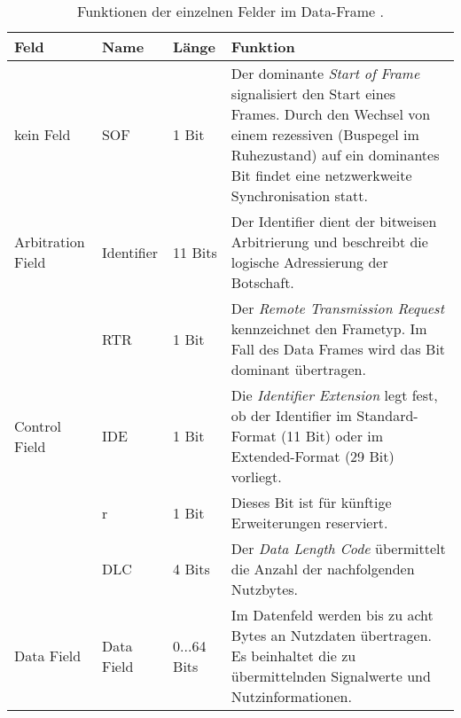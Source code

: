 \begin{table}[!htb]
	\centering
	\caption{Funktionen der einzelnen Felder im Data-Frame \cite{Wallentowitz.2011, Zimmermann.2014}.}
	\footnotesize
	\renewcommand{\arraystretch}{1.3}
	\begin{tabular}{l | l l p{7.5cm}}
		\toprule
		Feld              & Name       & Länge       & Funktion                                                                                                                                                                                                          \\ \midrule
		kein Feld         & SOF        & 1 Bit       & Der dominante \emph{Start of Frame} signalisiert den Start eines Frames. Durch den Wechsel von einem rezessiven (Buspegel im Ruhezustand) auf ein dominantes Bit findet eine netzwerkweite Synchronisation statt. \\
		\midrule
		Arbitration Field & Identifier & 11 Bits     & Der Identifier dient der bitweisen Arbitrierung und beschreibt die logische Adressierung der Botschaft.                                                                                                           \\
		                  & RTR        & 1 Bit       & Der \emph{Remote Transmission Request} kennzeichnet	den Frametyp. Im Fall des Data Frames wird das Bit dominant übertragen.                                                                                       \\
		\midrule
		Control Field & IDE        & 1 Bit       & Die \emph{Identifier Extension} legt fest, ob der Identifier im Standard-Format (11 Bit) oder im Extended-Format (29 Bit) vorliegt.                                                                               \\
		                  & r          & 1 Bit       & Dieses Bit ist für künftige Erweiterungen reserviert.                                                                                                                                                             \\
		                  & DLC        & 4 Bits      & Der \emph{Data Length Code} übermittelt die Anzahl der nachfolgenden Nutzbytes.                                                                                                                                   \\
		\midrule
		Data Field        & Data Field & 0...64 Bits & Im Datenfeld werden bis zu acht Bytes an Nutzdaten übertragen. Es beinhaltet die zu übermittelnden Signalwerte und Nutzinformationen.                                                                             \\

\end{tabular}
\end{table}
